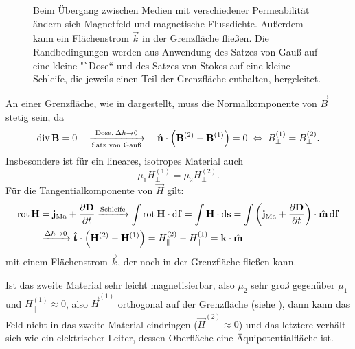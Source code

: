 \begin{figure}[ht]
	\centering
	\tfigBoundarySurfaceMagnetic
	\caption{Beim Übergang zwischen Medien mit verschiedener Permeabilität ändern sich Magnetfeld und magnetische Flussdichte. Außerdem kann ein Flächenstrom $\vec k$ in der Grenzfläche fließen.
		Die Randbedingungen werden aus Anwendung des Satzes von Gauß auf eine kleine "`Dose`` und des Satzes von Stokes auf eine kleine Schleife, die jeweils einen Teil der Grenzfläche enthalten, hergeleitet. }
	\label{fig:grenzflaeche_magnetic}
\end{figure}

An einer Grenzfläche, wie in  dargestellt, muss die Normalkomponente von $\vec {B}$ stetig sein, da
\begin{equation*}
	\operatorname{div} \mathbf{B}=0\quad\xrightarrow[\text{Satz von Gau\ss }]{\text{Dose},\: \Delta  h\rightarrow 0}\quad\hat{\mathbf{n}}\cdot \left(\mathbf{B}^{\left(2\right)}-\mathbf{B}^{\left(1\right)}\right)=0\;\Leftrightarrow\; B_{\perp }^{\left(1\right)}=B_{\perp }^{\left(2\right)}.
\end{equation*}
Insbesondere ist für ein lineares, isotropes Material auch
\begin{equation*}
	\mu _{1}H_{\perp }^{\left(1\right)}=\mu _{2}H_{\perp }^{\left(2\right)}.
\end{equation*}
Für die Tangentialkomponente von $\vec {H}$ gilt:
\begin{align*}
	\operatorname{rot} \mathbf{H} & =\mathbf{j}_{\mathrm{Ma}}+\frac{\partial \mathbf{D}}{\partial t}\xrightarrow{\text{Schleife}} \int \operatorname{rot} \mathbf{H}\cdot \mathop{}\!\mathrm{d} \mathbf{f}=\int \mathbf{H}\cdot \mathop{}\!\mathrm{d} \mathbf{s}=\int \left(\mathbf{j}_{\mathrm{Ma}}+\frac{\partial \mathbf{D}}{\partial t}\right)\cdot \hat{\mathbf{m}}\mathop{}\!\mathrm{d} \mathbf{f} \\
	              & \xrightarrow{\Delta  h\rightarrow 0}\hat{\mathbf{t}}\cdot \left(\mathbf{H}^{\left(2\right)}-\mathbf{H}^{\left(1\right)}\right)=H_{\parallel }^{\left(2\right)}-H_{\parallel }^{\left(1\right)}=\mathbf{k}\cdot \hat{\mathbf{m}}
\end{align*}
mit einem Flächenstrom $\vec {k}$, der noch in der Grenzfläche fließen kann.

Ist das zweite Material sehr leicht magnetisierbar, also $\mu _{2}$ sehr groß gegenüber $\mu _{1}$ und $H^{\left(1\right)}_\parallel\approx 0$, also $\vec {H}^{\left(1\right)}$ orthogonal auf der Grenzfläche (siehe ), dann kann das Feld nicht in das zweite Material eindringen ($\vec H^{(2)}\approx 0$) und das letztere verhält sich wie ein elektrischer Leiter, dessen Oberfläche eine Äquipotentialfläche ist.

